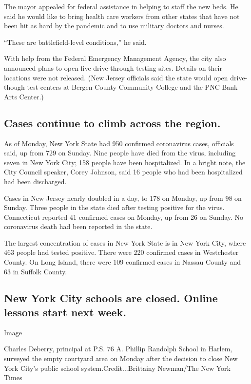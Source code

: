 The mayor appealed for federal assistance in helping to staff the new
beds. He said he would like to bring health care workers from other
states that have not been hit as hard by the pandemic and to use
military doctors and nurses.

``These are battlefield-level conditions,'' he said.

With help from the Federal Emergency Management Agency, the city also
announced plans to open five drive-through testing sites. Details on
their locations were not released. (New Jersey officials said the state
would open drive-though test centers at Bergen County Community College
and the PNC Bank Arts Center.)

\hypertarget{cases-continue-to-climb-across-the-region}{%
\subsection{Cases continue to climb across the
region.}\label{cases-continue-to-climb-across-the-region}}

As of Monday, New York State had 950 confirmed coronavirus cases,
officials said, up from 729 on Sunday. Nine people have died from the
virus, including seven in New York City; 158 people have been
hospitalized. In a bright note, the City Council speaker, Corey Johnson,
said 16 people who had been hospitalized had been discharged.

Cases in New Jersey nearly doubled in a day, to 178 on Monday, up from
98 on Sunday. Three people in the state died after testing positive for
the virus. Connecticut reported 41 confirmed cases on Monday, up from 26
on Sunday. No coronavirus death had been reported in the state.

The largest concentration of cases in New York State is in New York
City, where 463 people had tested positive. There were 220 confirmed
cases in Westchester County. On Long Island, there were 109 confirmed
cases in Nassau County and 63 in Suffolk County.

\hypertarget{new-york-city-schools-are-closed-online-lessons-start-next-week}{%
\subsection{New York City schools are closed. Online lessons start next
week.}\label{new-york-city-schools-are-closed-online-lessons-start-next-week}}

Image

Charles Deberry, principal at P.S. 76 A. Phillip Randolph School in
Harlem, surveyed the empty courtyard area on Monday after the decision
to close New York City's public school system.Credit...Brittainy
Newman/The New York Times

